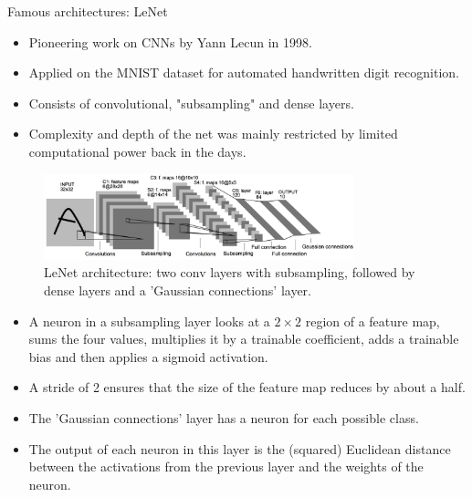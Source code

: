 










\begin{vbframe}{Famous architectures: LeNet}
  \begin{itemize}
    \item Pioneering work on CNNs by Yann Lecun in 1998. 
    \item Applied on the MNIST dataset for automated handwritten digit recognition.
    \item Consists of convolutional, "subsampling" and dense layers.
    \item Complexity and depth of the net was mainly restricted by limited computational power back in the days.
  \end{itemize}
  \begin{figure}
  \centering
    \includegraphics[width=9cm]{plots/architectures/lenet.png}
    \caption{LeNet architecture: two conv layers with subsampling, followed by dense layers and a 'Gaussian connections' layer.}
  \end{figure}
  \framebreak
  
  
  \begin{itemize}
    \item A neuron in a subsampling layer looks at a $2 \times 2$ region of a feature map, sums the four values, multiplies it by a trainable coefficient, adds a trainable bias and then applies a sigmoid activation.
    \item A stride of 2 ensures that the size of the feature map reduces by about a half.
    \item The 'Gaussian connections' layer has a neuron for each possible class. 
    \item The output of each neuron in this layer is the (squared) Euclidean distance between the activations from the previous layer and the weights of the neuron.
  \end{itemize}
\end{vbframe}
